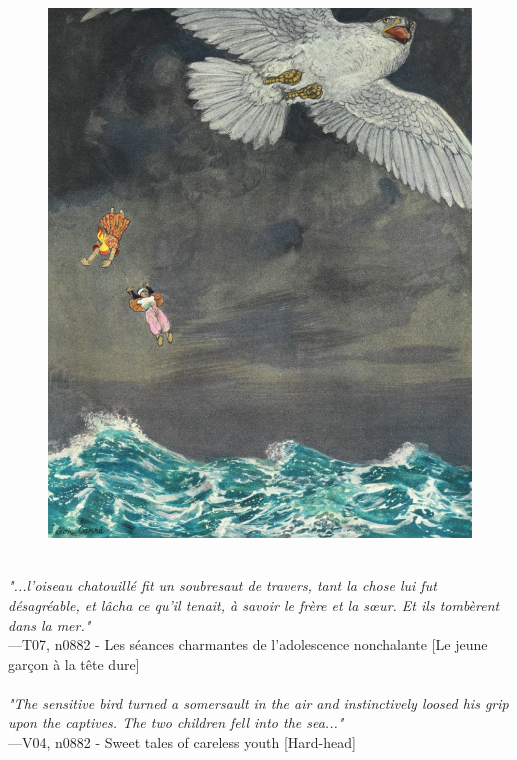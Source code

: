 \documentclass[../Carre_nights.tex]{subfiles}
\begin{document}
\begin{figure}[ht]
\centering
\includegraphics[height=\figsize]{illustrations/volume_7/T07, n0882 - Les séances charmantes de l'adolescence nonchalante [Le jeune garçon à la tête dure].jpg}
\end{figure}

\textit{\\
"...l’oiseau chatouillé fit un soubresaut de travers, tant la chose lui fut désagréable, et lâcha ce qu’il tenait, à savoir le frère et la sœur. Et ils tombèrent dans la mer."} \\
—T07, n0882 - Les séances charmantes de l'adolescence nonchalante [Le jeune garçon à la tête dure] \\~\\
\textit{"The sensitive bird turned a somersault in the air and instinctively loosed his grip upon the captives. The two children fell into the sea..."} \\
—V04, n0882 - Sweet tales of careless youth [Hard-head]

\newpage
\end{document}
